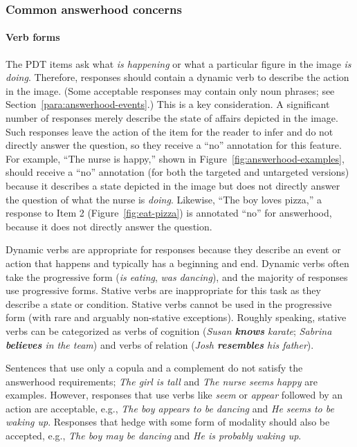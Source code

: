 \documentclass[12pt,notitlepage]{article}
\begin{document}
\subsubsection{Common answerhood concerns}

\paragraph{Verb forms} 
The PDT items ask what \textit{is happening} or what a particular figure in the image \textit{is doing}. Therefore, responses should contain a dynamic verb to describe the action in the image. (Some acceptable responses may contain only noun phrases; see Section~\ref{para:answerhood-events}.) This is a key consideration. A significant number of responses merely describe the state of affairs depicted in the image. Such responses leave the action of the item for the reader to infer and do not directly answer the question, so they receive a ``no'' annotation for this feature. For example, ``The nurse is happy,'' shown in Figure~\ref{fig:answerhood-examples}, should receive a ``no'' annotation (for both the targeted and untargeted versions) because it describes a state depicted in the image but does not directly answer the question of what the nurse is \textit{doing}. Likewise, ``The boy loves pizza,'' a response to Item 2 (Figure~\ref{fig:eat-pizza}) is annotated ``no'' for answerhood, because it does not directly answer the question.

Dynamic verbs are appropriate for responses because they describe an event or action that happens and typically has a beginning and end. Dynamic verbs often take the progressive form (\textit{is eating}, \textit{was dancing}), and the majority of responses use progressive forms. Stative verbs are inappropriate for this task as they describe a state or condition. Stative verbs cannot be used in the progressive form (with rare and arguably non-stative exceptions). Roughly speaking, stative verbs can be categorized as verbs of cognition (\textit{Susan \textbf{knows} karate}; \textit{Sabrina \textbf{believes} in the team}) and verbs of relation (\textit{Josh \textbf{resembles} his father}). 

Sentences that use only a copula and a complement do not satisfy the answerhood requirements;  \textit{The girl is tall} and \textit{The nurse seems happy} are examples. However, responses that use verbs like \textit{seem} or \textit{appear} followed by an action are acceptable, e.g., \textit{The boy appears to be dancing} and \textit{He seems to be waking up}. Responses that hedge with some form of modality should also be accepted, e.g., \textit{The boy may be dancing} and \textit{He is probably waking up}.
\end{document}

